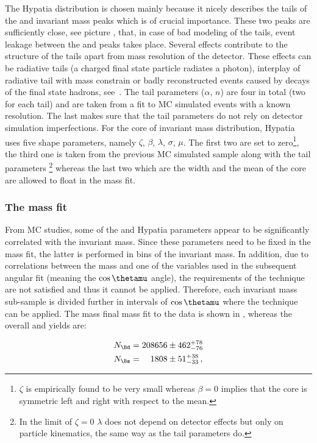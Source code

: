 The Hypatia distribution is chosen mainly because it nicely describes the tails of the \Bs and \Bd invariant mass peaks which is
of crucial importance. These two peaks are sufficiently close,
see picture , that, in case of bad modeling of the tails, event leakage between the \Bs and \Bd peaks
takes place. Several effects contribute to the structure of the tails apart from mass resolution of the detector. These effects
can be radiative tails (a charged final state particle radiates a photon), interplay of radiative tail with \Jpsi mass constrain
or badly reconstructed events caused by decays of the final state hadrons, see~\cite{Santos:2013gra}. The tail parameters ($\alpha$, $n$)
are four in total (two for each tail) and are taken from a fit to MC simulated events with a known resolution. The last makes sure that
the tail parameters do not rely on detector simulation imperfections.
For the core of invariant mass distribution, Hypatia uses five shape parameters, namely $\zeta$, $\beta$, $\lambda$, $\sigma$, $\mu$.
The first two are set to zero\footnote{$\zeta$ is empirically found to be very small whereas
$\beta = 0$ implies that the core is symmetric left and right with respect to the mean.}, the third one is taken from the previous
MC simulated sample along with the tail parameters \footnote{In the limit of $\zeta = 0$ $\lambda$ does not depend on detector
effects but only on particle kinematics, the same way as the tail parameters do.} whereas the last two which are the width and
the mean of the core are allowed to float in the mass fit.

\subsubsection{The mass fit}
From MC studies, some of the \Bs and \Bd Hypatia parameters appear to be significantly correlated with the \mkpi invariant mass.
Since these parameters need to be fixed in the mass fit, the latter is performed in bins of the
\mkpi invariant mass. In addition, due to correlations between the mass and one of the variables used in the subsequent angular fit
(meaning the $\cos\thetamu$ angle), the requirements of the \sPlot technique are not satisfied and thus it cannot be applied.
Therefore, each \mkpi invariant mass sub-sample is divided further in intervals of $\cos\thetamu$ where the \sPlot technique
can be applied.  The mass final mass fit to the data is shown in , whereas the overall \Bs and \Bd yields are:


\begin{align}
N_{\Bd} &= 208656  \pm  462 ^{+ 78	}_{- 76}\\
N_{\Bs} &= \phantom{00}1808  \pm   51 ^{+ 38	}_{- 33} \, ,
\label{signal_yields}
\end{align}

